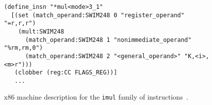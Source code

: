 \begin{figure}[H]
    \centering
\begin{verbatim}
(define_insn "*mul<mode>3_1"
  [(set (match_operand:SWIM248 0 "register_operand" "=r,r,r")
	(mult:SWIM248
	  (match_operand:SWIM248 1 "nonimmediate_operand" "%rm,rm,0")
	  (match_operand:SWIM248 2 "<general_operand>" "K,<i>,<m>r")))
   (clobber (reg:CC FLAGS_REG))]
   ...
\end{verbatim}
    \caption{
x86 machine description
  for the \texttt{imul}
  family of instructions~\cite{gccx86isa}.
}
    \label{fig:intro:gcc-imul}
\end{figure}
